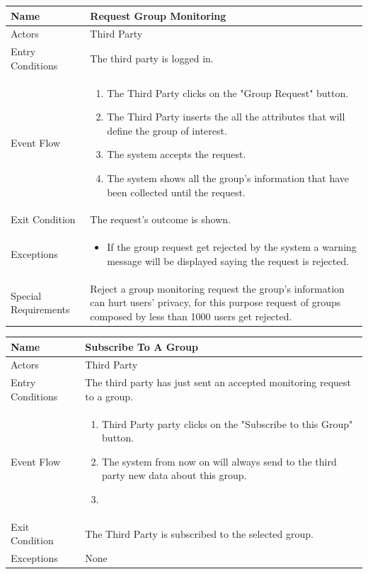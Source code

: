 \begin{enumerate}
\FloatBarrier
\begin{table}[h]
\begin{tabular}{|l|p{}|}
\hline
Name             & Request Group Monitoring \\ \hline
Actors           & Third Party  \\ \hline
Entry Conditions & The third party is logged in.    \\ \hline
Event Flow       & \begin{enumerate}
            \item The Third Party clicks on the "Group Request" button.
            \item The Third Party inserts the all the attributes that will define the group of interest.
            \item The system accepts the request.
            \item The system shows all the group's information that have been collected until the request. 
        \end{enumerate}\\ \hline
Exit Condition   & The request's outcome is shown.\\ \hline
Exceptions       & \begin{itemize}
\item If the group request get rejected by the system a warning message will be displayed saying the request is rejected.
\end{itemize}\\ \hline
Special Requirements & Reject a group monitoring request the group's information can hurt users' privacy, for this purpose request of groups composed by less than 1000 users get rejected.
\\ \hline
\end{tabular}
\end{table}
\FloatBarrier

\FloatBarrier
\begin{table}[h]
\begin{tabular}{|l|p{}|}
\hline
Name             & Subscribe To A Group\\ \hline
Actors           & Third Party  \\ \hline
Entry Conditions & The third party has just sent an accepted monitoring request to a group. \\ \hline
Event Flow       & \begin{enumerate}
            \item Third Party party clicks on the "Subscribe to this Group" button.
            \item The system from now on will always send to the third party new data about this group.
            \item 
        \end{enumerate}\\ \hline
Exit Condition   & The Third Party is subscribed to the selected group.\\ \hline
Exceptions       & None \\ \hline
\end{tabular}
\end{table}
\FloatBarrier


\end{enumerate}
